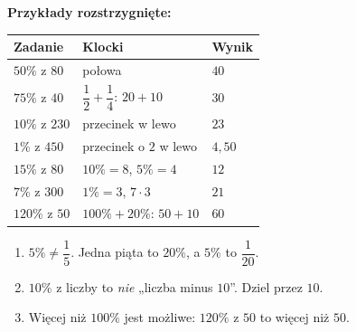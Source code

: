 \documentclass[11pt,a4paper]{article}
\begin{document}
\vspace{-0.3em}
\textbf{Przykłady rozstrzygnięte:}
\begin{center}
\renewcommand{\arraystretch}{1.5}
\begin{tabular}{@{}lll@{}}
\toprule
Zadanie & Klocki & Wynik \\
\midrule
$50\%$ z $80$ & połowa & $40$ \\
$75\%$ z $40$ & $\dfrac{1}{2}+\dfrac{1}{4}$: $20+10$ & $30$ \\[4pt]
$10\%$ z $230$ & przecinek w lewo & $23$ \\
$1\%$ z $450$ & przecinek o $2$ w lewo & $4{,}50$ \\
$15\%$ z $80$ & $10\%=8$, $5\%=4$ & $12$ \\
$7\%$ z $300$ & $1\%=3$, $7\cdot 3$ & $21$ \\
$120\%$ z $50$ & $100\%+20\%$: $50+10$ & $60$ \\
\bottomrule
\end{tabular}
\end{center}

\begin{pulapka}
\begin{enumerate}[leftmargin=*, itemsep=2pt]
  \item $5\%\neq\dfrac{1}{5}$. Jedna piąta to $20\%$, a $5\%$ to $\dfrac{1}{20}$.
  \item $10\%$ z liczby to \emph{nie} „liczba minus $10$”. Dziel przez $10$.
  \item Więcej niż $100\%$ jest możliwe: $120\%$ z $50$ to więcej niż $50$.
\end{enumerate}
\end{pulapka}
\end{document}
